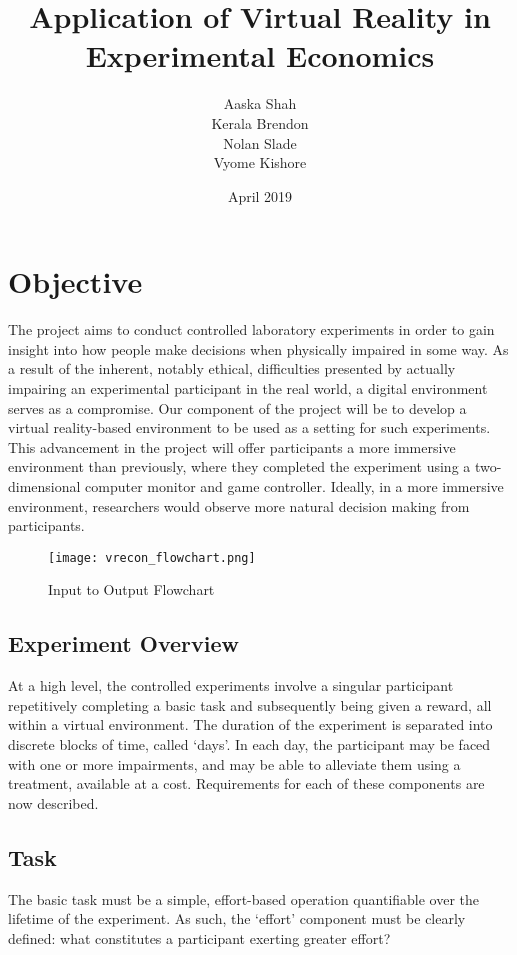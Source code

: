 \documentclass{article}
\title{Application of Virtual Reality in Experimental Economics}
\author{Aaska Shah\\Kerala Brendon\\Nolan Slade\\Vyome Kishore}
\date{April 2019}
\begin{document}
\maketitle
 
\newpage

\tableofcontents

\newpage

\section{Objective}
The project aims to conduct controlled laboratory experiments in order to gain insight into how people make decisions when physically impaired in some way. As a result of the inherent, notably ethical, difficulties presented by actually impairing an experimental participant in the real world, a digital environment serves as a compromise. Our component of the project will be to develop a virtual reality-based environment to be used as a setting for such experiments. This advancement in the project will offer participants a more immersive environment than previously, where they completed the experiment using a two-dimensional computer monitor and game controller. Ideally, in a more immersive environment, researchers would observe more natural decision making from participants.

\begin{figure}[h!]
\centering
\texttt{[image: vrecon\_flowchart.png]}
\caption{Input to Output Flowchart}
\label{fig:flowchart}
\end{figure}

\subsection{Experiment Overview}
At a high level, the controlled experiments involve a singular participant repetitively completing a basic task and subsequently being given a reward, all within a virtual environment. The duration of the experiment is separated into discrete blocks of time, called ‘days’. In each day, the participant may be faced with one or more impairments, and may be able to alleviate them using a treatment, available at a cost. Requirements for each of these components are now described.

\subsection{Task}
The basic task must be a simple, effort-based operation quantifiable over the lifetime of the experiment. As such, the ‘effort’ component must be clearly defined: what constitutes a participant exerting greater effort? 
\end{document}
